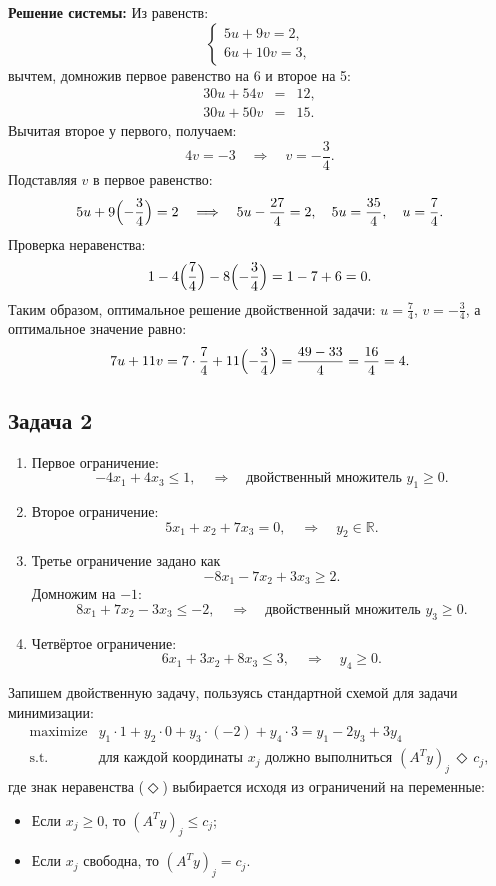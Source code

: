 \documentclass[a4paper,12pt]{article}
\begin{document}
	\textbf{Решение системы:} Из равенств:
	\[
	\begin{cases}
		5u+9v=2,\\[1mm]
		6u+10v=3,
	\end{cases}
	\]
	вычтем, домножив первое равенство на 6 и второе на 5:
	\[
	\begin{array}{rcl}
		30u+54v&=&12,\\[1mm]
		30u+50v&=&15.
	\end{array}
	\]
	Вычитая второе у первого, получаем:
	\[
	4v = -3 \quad\Longrightarrow\quad v = -\frac{3}{4}.
	\]
	Подставляя $v$ в первое равенство:
	\[
	5u+9\Bigl(-\frac{3}{4}\Bigr)=2\quad\Longrightarrow\quad 5u - \frac{27}{4} =2,\quad 5u = \frac{35}{4},\quad u = \frac{7}{4}.
	\]
	Проверка неравенства:
	\[
	1-4\Bigl(\frac{7}{4}\Bigr)-8\Bigl(-\frac{3}{4}\Bigr)= 1-7+6 =0.
	\]
	Таким образом, оптимальное решение двойственной задачи: $u=\frac{7}{4}$, $v=-\frac{3}{4}$, а оптимальное значение равно:
	\[
	7u+11v=7\cdot\frac{7}{4}+11\Bigl(-\frac{3}{4}\Bigr)=\frac{49-33}{4}=\frac{16}{4}=4.
	\]
	
	\bigskip
	
	\subsection*{Задача 2}
	
	
	\medskip 
	\begin{enumerate}[label=\arabic*)]
		\item Первое ограничение: 
		\[
		-4x_1+4x_3\le 1,\quad \Rightarrow\quad \text{двойственный множитель } y_1\ge 0.
		\]
		\item Второе ограничение:
		\[
		5x_1+x_2+7x_3=0,\quad \Rightarrow\quad y_2\in\mathbb{R}.
		\]
		\item Третье ограничение задано как
		\[
		-8x_1-7x_2+3x_3 \ge 2.
		\]
		Домножим на $-1$:
		\[
		8x_1+7x_2-3x_3 \le -2,\quad \Rightarrow\quad \text{двойственный множитель } y_3\ge 0.
		\]
		\item Четвёртое ограничение:
		\[
		6x_1+3x_2+8x_3 \le 3,\quad \Rightarrow\quad y_4\ge 0.
		\]
	\end{enumerate}
	
	Запишем двойственную задачу, пользуясь стандартной схемой для задачи минимизации:
	\[
	\begin{array}{rl}
		\text{maximize} & y_1\cdot 1 + y_2\cdot 0 + y_3\cdot (-2) + y_4\cdot 3 = y_1 -2y_3+3y_4\\[1mm]
		\text{s.t.} & \text{для каждой координаты } x_j\text{ должно выполниться } (A^T y)_j \,\Diamond\, c_j,
	\end{array}
	\]
	где знак неравенства ($\Diamond$) выбирается исходя из ограничений на переменные:
	\begin{itemize}[leftmargin=1cm]
		\item Если $x_j \ge 0$, то $(A^T y)_j \le c_j$;
		\item Если $x_j$ свободна, то $(A^T y)_j = c_j$.
	\end{itemize}
	
\end{document}
